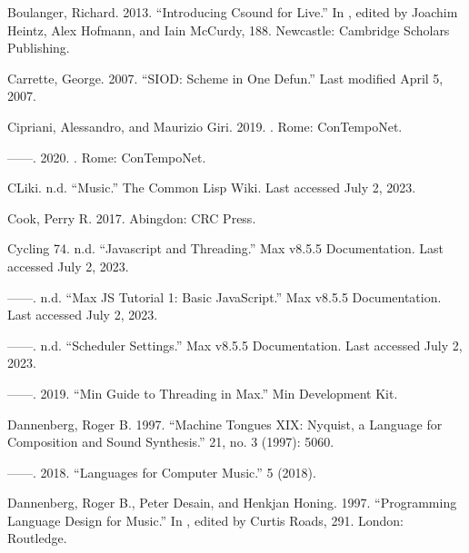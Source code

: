 \documentclass[letterpaper,10pt,english]{sphinxmanual}
\begin{document}
\sphinxAtStartPar
Boulanger, Richard. 2013. “Introducing Csound for Live.” In , edited by Joachim Heintz, Alex Hofmann, and Iain McCurdy, 188. Newcastle: Cambridge Scholars Publishing.

\sphinxAtStartPar
Carrette, George. 2007. “SIOD: Scheme in One Defun.” Last modified April 5, 2007. 

\sphinxAtStartPar
Cipriani, Alessandro, and Maurizio Giri. 2019. . Rome: ConTempoNet.

\sphinxAtStartPar
——. 2020. . Rome: ConTempoNet.

\sphinxAtStartPar
CLiki. n.d. “Music.” The Common Lisp Wiki. Last accessed July 2, 2023. 

\sphinxAtStartPar
Cook, Perry R. 2017.  Abingdon: CRC Press.

\sphinxAtStartPar
Cycling 74. n.d. “Javascript and Threading.”  Max v8.5.5 Documentation. Last accessed July 2, 2023. 

\sphinxAtStartPar
——. n.d. “Max JS Tutorial 1: Basic JavaScript.”  Max v8.5.5 Documentation. Last accessed July 2, 2023. 

\sphinxAtStartPar
——. n.d. “Scheduler Settings.” Max v8.5.5 Documentation. Last accessed July 2, 2023. 

\sphinxAtStartPar
——. 2019. “Min Guide to Threading in Max.” Min Development Kit. 

\sphinxAtStartPar
Dannenberg, Roger B. 1997. “Machine Tongues XIX: Nyquist, a Language for Composition and Sound Synthesis.”  21, no. 3 (1997): 50\textendash{}60.

\sphinxAtStartPar
——. 2018. “Languages for Computer Music.”  5 (2018).

\sphinxAtStartPar
Dannenberg, Roger B., Peter Desain, and Henkjan Honing. 1997. “Programming Language Design for Music.” In , edited by Curtis Roads, 291. London: Routledge.
\end{document}
